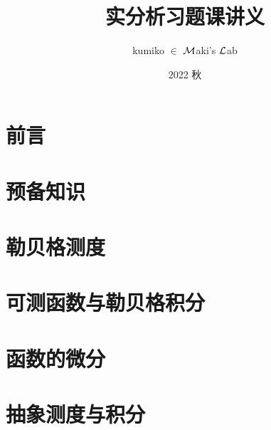 \documentclass[lang=cn, color=none]{elegantbook}
\title{实分析习题课讲义}
\subtitle{}
\author{kumiko $\in$ $\calM$aki's $\calL$ab}
\institute{$\calM$aki's $\calL$ab}
\date{2022 秋}
\begin{document}

\maketitle
\frontmatter
\chapter*{前言}




\tableofcontents


\mainmatter
\chapter{预备知识}
    
    
    
\chapter{勒贝格测度}
    
    
    
    
    
    
\chapter{可测函数与勒贝格积分}
    

    
    
    
    
    

    

\chapter{函数的微分}
    
    

\chapter{抽象测度与积分}
    
    

\end{document}
